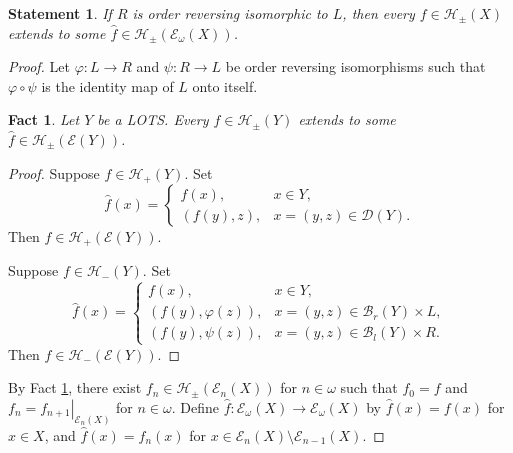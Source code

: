 \documentclass[preprint]{elsarticle}
\def\om{\omega}
\def\ph{\varphi}
\def\cB{\mathcal{B}}
\def\cE{\mathcal{E}}
\def\cH{\mathcal{H}}
\def\cB{{\mathcal B}}
\def\cB{{\mathcal B}}
\def\cD{{\mathcal D}}
\newcommand\restrB[2]{\ensuremath{\left.#1\right|_{#2}}}
\def\restr#1#2{\restrB{#1}{#2}}
\newtheorem{statement}{Statement}[section]
\newtheorem{claim}{Fact}
\theoremstyle{definition}
\theoremstyle{remark}
\def\nom{{n\in\om}}
\def\oip#1{\cH_{+}(#1)}
\def\oim#1{\cH_{-}(#1)}
\def\oipm#1{\cH_{\pm}(#1)}
\def\er{\cB_r}
\def\el{\cB_l}
\def\ex{\cE}
\begin{document}
\begin{statement}\label{s:exos:2}
If $R$ is order reversing isomorphic to $L$, then every $f\in\oipm X$ extends to some $\hat f\in \oipm{\ex_\om(X)}$.
\end{statement}
\begin{proof}
Let $\ph: L\to R$ and $\psi: R\to L$ be order reversing isomorphisms such that $\ph\circ \psi$ is the identity map of $L$ onto itself.
\begin{claim}\label{cl:exos:1-1}
Let $Y$ be a LOTS. Every $f\in\oipm Y$ extends to some $\hat f\in \oipm{\ex(Y)}$.
\end{claim}
\begin{proof}
Suppose $f\in \oip Y$. Set
\[
\hat f(x) = \begin{cases}
f(x), & x\in Y,
\\
(f(y),z), & x=(y,z)\in \cD(Y).
\end{cases}
\]
Then $\hat f\in \oip{\ex(Y)}$.

Suppose $f\in \oim Y$. Set
\[
\hat f(x) = \begin{cases}
f(x), & x\in Y,
\\
(f(y),\ph(z)), & x=(y,z)\in \er(Y) \times L,
\\
(f(y),\psi(z)), & x=(y,z)\in \el(Y) \times R.
\end{cases}
\]
Then $\hat f\in \oim{\ex(Y)}$.
\end{proof}
By Fact \ref{cl:exos:1-1}, there exist $f_n\in\oipm{\ex_n(X)}$ for $\nom$ such that $f_0=f$ and $f_n=\restr{f_{n+1}}{\ex_n(X)}$ for $\nom$. Define $\hat f: \ex_\om(X)\to \ex_\om(X)$ by $\hat f(x)=f(x)$ for $x\in X$, and $\hat f(x)=f_n(x)$ for $x\in \ex_n(X)\setminus \ex_{n-1}(X)$.
\end{proof}
\end{document}
